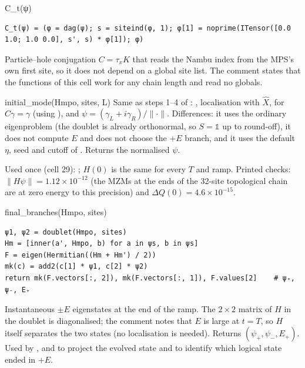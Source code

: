 \documentclass[11pt]{article}
\begin{document}
\begin{function}{C\_t(ψ)}
\begin{Verbatim}
C_t(ψ) = (φ = dag(ψ); s = siteind(φ, 1); φ[1] = noprime(ITensor([0.0 1.0; 1.0 0.0], s', s) * φ[1]); φ)
\end{Verbatim}
Particle--hole conjugation $C=\tau_xK$ that reads the Nambu index from the MPS's own first site, so it does not
depend on a global site list. The comment states that the functions of this cell work for any chain length and read
no globals.
\end{function}

\begin{function}{initial\_mode(Hmpo, sites, L)}
Same as steps 1--4 of : , localisation with $\hat X$,  for
$C\gamma=\gamma$ (using ), and $\psi=(\gamma_L+i\gamma_R)/\lVert\cdot\rVert$. Differences: it uses the
ordinary eigenproblem  (the doublet is already orthonormal, so $S=\mathbb 1$ up
to round-off), it does not compute $E$ and does not choose the $+E$ branch, and it uses the default
$\eta$, seed and cutoff of . Returns the normalised $\psi$.

Used once (cell 29): ; $H(0)$ is the same
for every $T$ and ramp. Printed checks: $\lVert H\psi\rVert = 1.12\times10^{-12}$ (the MZMs at the ends of the
32-site topological chain are at zero energy to this precision) and $\Delta Q(0)=4.6\times10^{-15}$.
\end{function}

\begin{function}{final\_branches(Hmpo, sites)}
\begin{Verbatim}
ψ1, ψ2 = doublet(Hmpo, sites)
Hm = [inner(a', Hmpo, b) for a in ψs, b in ψs]
F = eigen(Hermitian((Hm + Hm') / 2))
mk(c) = add2(c[1] * ψ1, c[2] * ψ2)
return mk(F.vectors[:, 2]), mk(F.vectors[:, 1]), F.values[2]    # ψ₊, ψ₋, E₊
\end{Verbatim}
Instantaneous $\pm E$ eigenstates at the end of the ramp. The $2\times2$ matrix of $H$ in the doublet is
diagonalised; the comment notes that $E$ is large at $t=T$, so $H$ itself separates the two states (no localisation
is needed). Returns $(\psi_+,\psi_-,E_+)$. Used by ,  and
 to project the evolved state and to identify which logical state ended in $+E$.
\end{function}
\end{document}
